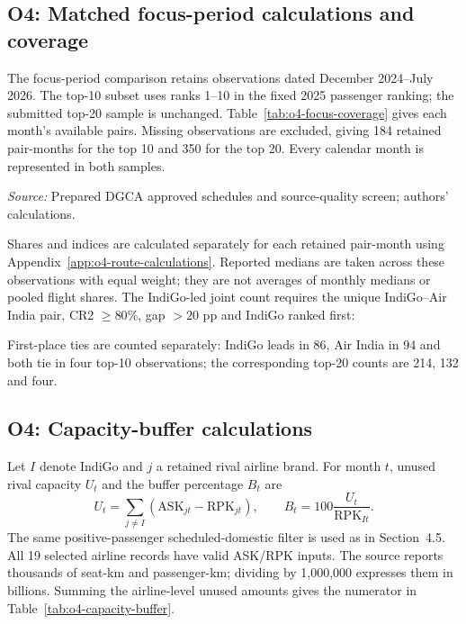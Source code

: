 \documentclass[12pt,a4paper]{article}
\begin{document}
\clearpage
\subsection{O4: Matched focus-period calculations and coverage}
\label{app:o4-route-focus}
The focus-period comparison retains observations dated December 2024--July 2026. The top-10 subset uses ranks 1--10 in the fixed 2025 passenger ranking; the submitted top-20 sample is unchanged. Table~\ref{tab:o4-focus-coverage} gives each month's available pairs. Missing observations are excluded, giving 184 retained pair-months for the top 10 and 350 for the top 20. Every calendar month is represented in both samples.

\begin{minipage}{\linewidth}
\captionsetup{font=small,labelfont=bf,justification=raggedright,singlelinecheck=false,hypcap=false}
\label{tab:o4-focus-coverage}
\centering
{\small{}\par}
\vspace{4pt}
{\footnotesize{}\raggedright\textit{Source:} Prepared DGCA approved schedules and source-quality screen; authors' calculations.\par}
\end{minipage}

Shares and indices are calculated separately for each retained pair-month using Appendix~\ref{app:o4-route-calculations}. Reported medians are taken across these observations with equal weight; they are not averages of monthly medians or pooled flight shares. The IndiGo-led joint count requires the unique IndiGo--Air India pair, CR2 $\geq80\%$, gap $>20$ pp and IndiGo ranked first:

First-place ties are counted separately: IndiGo leads in 86, Air India in 94 and both tie in four top-10 observations; the corresponding top-20 counts are 214, 132 and four.

\clearpage
\subsection{O4: Capacity-buffer calculations}
\label{app:o4-capacity-buffer}
Let $I$ denote IndiGo and $j$ a retained rival airline brand. For month $t$, unused rival capacity $U_t$ and the buffer percentage $B_t$ are
\[
U_t=\sum_{j\ne I}(\mathrm{ASK}_{jt}-\mathrm{RPK}_{jt}),
\qquad B_t=100\frac{U_t}{\mathrm{RPK}_{It}}.
\]
The same positive-passenger scheduled-domestic filter is used as in Section~4.5. All 19 selected airline records have valid ASK/RPK inputs. The source reports thousands of seat-km and passenger-km; dividing by 1,000,000 expresses them in billions. Summing the airline-level unused amounts gives the numerator in Table~\ref{tab:o4-capacity-buffer}.
\end{document}
